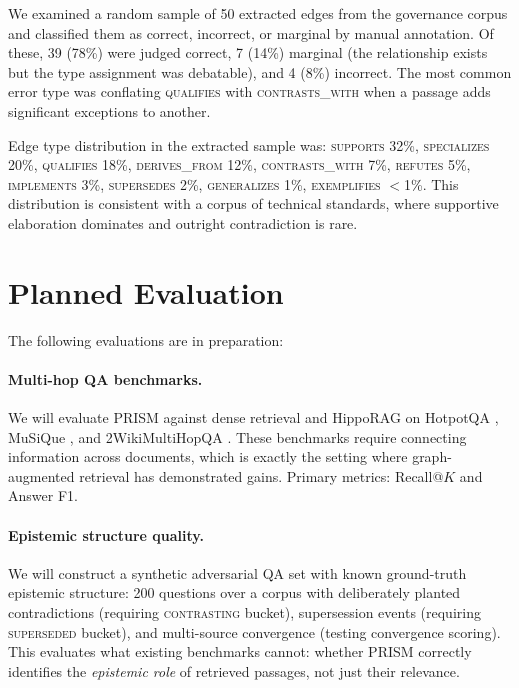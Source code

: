 \documentclass[11pt,a4paper]{article}
\begin{document}
We examined a random sample of 50 extracted edges from the governance
corpus and classified them as correct, incorrect, or marginal by manual
annotation. Of these, 39 (78\%) were judged correct, 7 (14\%) marginal
(the relationship exists but the type assignment was debatable), and
4 (8\%) incorrect. The most common error type was conflating
\textsc{qualifies} with \textsc{contrasts\_with} when a passage adds
significant exceptions to another.

Edge type distribution in the extracted sample was:
\textsc{supports} 32\%, \textsc{specializes} 20\%,
\textsc{qualifies} 18\%, \textsc{derives\_from} 12\%,
\textsc{contrasts\_with} 7\%, \textsc{refutes} 5\%,
\textsc{implements} 3\%, \textsc{supersedes} 2\%,
\textsc{generalizes} 1\%, \textsc{exemplifies} $<$1\%.
This distribution is consistent with a corpus of technical standards,
where supportive elaboration dominates and outright contradiction is rare.


\section{Planned Evaluation}
\label{sec:future}

The following evaluations are in preparation:

\paragraph{Multi-hop QA benchmarks.}
We will evaluate PRISM against dense retrieval and HippoRAG
\citep{gutierrez2024hipporag} on HotpotQA \citep{yang2018hotpotqa},
MuSiQue \citep{trivedi2022musique}, and 2WikiMultiHopQA
\citep{ho2020constructing}. These benchmarks require connecting
information across documents, which is exactly the setting where
graph-augmented retrieval has demonstrated gains. Primary metrics:
Recall@$K$ and Answer F1.

\paragraph{Epistemic structure quality.}
We will construct a synthetic adversarial QA set with known ground-truth
epistemic structure: 200 questions over a corpus with deliberately planted
contradictions (requiring \textsc{contrasting} bucket), supersession
events (requiring \textsc{superseded} bucket), and multi-source
convergence (testing convergence scoring). This evaluates what existing
benchmarks cannot: whether PRISM correctly identifies the \emph{epistemic
role} of retrieved passages, not just their relevance.
\end{document}
